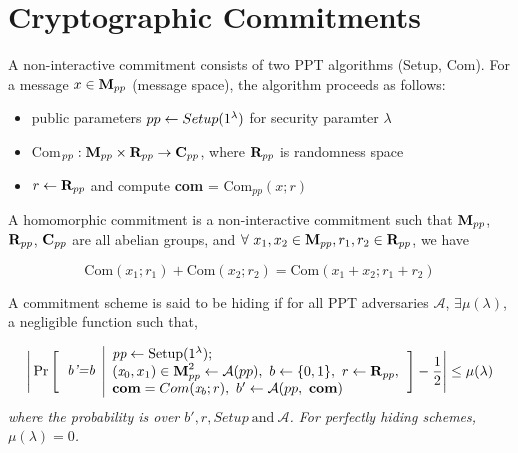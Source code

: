 \section{Cryptographic Commitments}

\begin{defn}[Commitments]
    A non-interactive commitment consists of two PPT algorithms {\normalfont(Setup, Com)}. For a message $x \in {\normalfont \textbf{M}_{pp}}$ (message space), the algorithm proceeds as follows:
    \begin{itemize}
    \setlength\itemsep{0.3em}
        \item public parameters $pp \leftarrow {\normalfont Setup}(1^{\lambda})$ for security paramter $\lambda$
        \item {\normalfont Com}$_{pp} : {\normalfont \textbf{M}_{pp}} \times {\normalfont \textbf{R}_{pp}} \rightarrow {\normalfont \textbf{C}_{pp}}$, 
        where ${\normalfont \textbf{R}_{pp}}$ is randomness space
        \item $r \leftarrow {\normalfont \textbf{R}_{pp}}$ and compute {\normalfont \textbf{com}} = {\normalfont Com}$_{pp}(x;r)$
    \end{itemize}
\end{defn}

\begin{defn}
    A homomorphic commitment is a non-interactive commitment such that ${\normalfont \textbf{M}_{pp}}$, ${\normalfont \textbf{R}_{pp}}$, ${\normalfont \textbf{C}_{pp}}$ are all abelian groups, and $\forall \ x_1, x_2 \in {\normalfont \textbf{M}_{pp}}, r_1, r_2 \in {\normalfont \textbf{R}_{pp}}$, we have 
\end{defn}
\begin{equation*}
    \text{Com}(x_1; r_1) + \text{Com}(x_2; r_2) = \text{Com}(x_1+ x_2; r_1+r_2)
\end{equation*}

\begin{defn}
    A commitment scheme is said to be hiding if for all PPT adversaries $\mathcal{A}$, $\exists \mu(\lambda)$, a negligible function such that,  
\end{defn}
\begin{equation*}
        \Bigg|
        \Pr
        \Bigg[
        \begin{tabular}{c | l}
             \multirow{3}{*}{$\textit{b'=b}$} 
             &
             $\textit{pp} \leftarrow \text{Setup}(1^{\lambda})$;\\
             &
             $(\textit{x}_0,x_1) \in \text{\textbf{M}}_{pp}^2 \leftarrow \mathcal{A}(pp), \
             b \leftarrow \{0,1\}, \ 
             r \leftarrow \text{\textbf{R}}_{pp},$ \\
             &
             $\textbf{com} = Com(\textit{x}_b; r),\ b' \leftarrow \mathcal{A}(pp, \ \textbf{com})$
        \end{tabular}
        \Bigg]
        - \frac{1}{2}
        \Bigg|
        \leq \mu(\lambda)
\end{equation*}
\textit{where the probability is over $b', r, Setup \ \text{and} \ \mathcal{A}$. For perfectly hiding schemes, $\mu(\lambda)=0$.}


